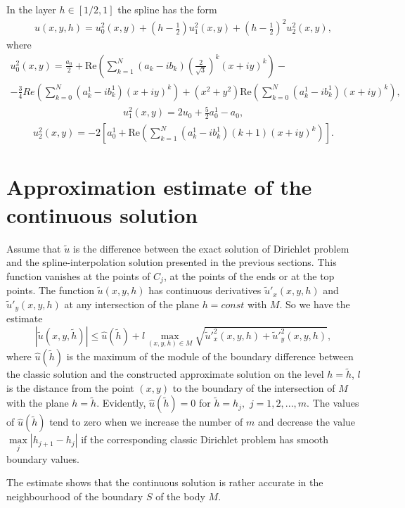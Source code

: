 \documentclass{amsart}
\begin{document}
In the layer $h \in [1/2,1]$ the spline has the form
\begin{eqnarray}
u(x,y,h)=u_0^2(x,y)+(h-\frac{1}{2}) u_1^2(x,y)+(h-\frac{1}{2})^2
u_2^2(x,y),\nonumber
\end{eqnarray}
where
\begin{eqnarray}
u_0^2(x,y)=\frac{a_0}{2}+ \mathrm{Re} (\sum_{k=1}^N (a_k-i b_k)(\frac{2}{\sqrt3})^k (x+i y)^k)-\nonumber\\
-\frac{3}{4} Re (\sum_{k=0}^N (a_k^1-i b_k^1)(x+i y)^k)+ (x^2+y^2)
\mathrm{Re} (\sum_{k=0}^N (a_k^1-i b_k^1)(x+i y)^k),\nonumber
\end{eqnarray}
\begin{eqnarray}
u_1^2(x,y)=2 u_0 + \frac{5}{2} a_0^1- a_0,\nonumber
\end{eqnarray}
\begin{eqnarray}
u_2^2(x,y)=-2 [a_0^1+ \mathrm{Re} (\sum_{k=1}^N (a_k^1-i b_k^1)
(k+1)(x+i y)^k)].\nonumber
\end{eqnarray}



\section{Approximation estimate of the continuous solution}


Assume that $\tilde{u}$ is the difference between the exact solution
of Dirichlet problem and the spline-interpolation solution presented
in the previous sections. This function vanishes at the points of
$C_j$, at the points of the ends or at the top points. The function
$\tilde{u}(x,y,h)$ has continuous derivatives $\tilde{u}'_x(x,y,h)$
and $\tilde{u}'_y(x,y,h)$ at any intersection of the plane $h=const$
with $M$. So we have the estimate
$$
|\tilde{u}(x,y,\tilde{h})| \leq \hat{u}(\tilde{h}) + l
\max\limits_{(x,y,h)\in M}
\sqrt{\tilde{u}'^2_x(x,y,h)+\tilde{u}'^2_y(x,y,h)},
$$
where $\hat{u}(\tilde{h})$ is the maximum of the module of the
boundary difference between the classic solution and the constructed
approximate solution on the level $h=\tilde{h}$, $l$ is the distance
from the point $(x,y)$ to the boundary of the intersection of $M$
with the plane $h=\tilde{h}$. Evidently, $\hat{u}(\tilde{h})=0$ for
$\tilde{h}=h_j,$ $j=1,2,...,m$. The values of $\hat{u}(\tilde{h})$
tend to zero when we increase the number of $m$ and decrease the
value $\max\limits_j|h_{j+1}-h_j|$ if the corresponding classic
Dirichlet problem has smooth boundary values.

The estimate shows that the continuous solution is rather accurate
in the neighbourhood of the boundary $S$ of the body $M$.
\end{document}
